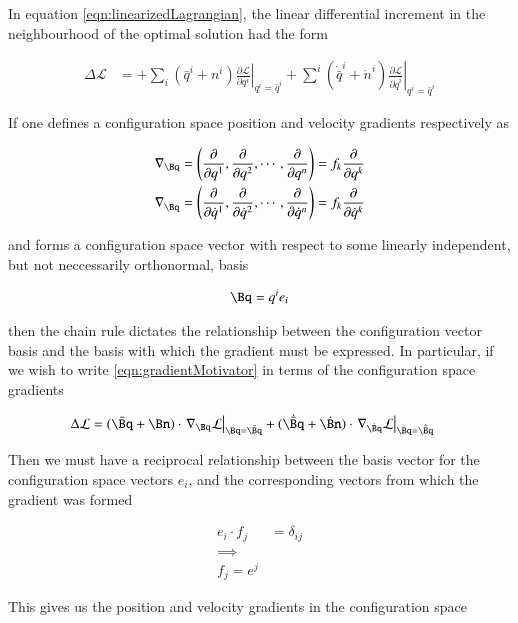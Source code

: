 \documentclass{article}
\newcommand{\LL}[0]{\mathcal{L}}
\newcommand{\qdot}[0]{\dot{q}}
\newcommand{\ndot}[0]{\dot{n}}
\newcommand{\qbar}[0]{\bar{q}}
\newcommand{\qdotbar}[0]{\dot{\bar{q}}}
\newcommand{\PD}[2]{\frac{\partial {#2}}{\partial {#1}}}
\newcommand{\grad}[0]{\nabla}
\begin{document}
In equation \ref{eqn:linearizedLagrangian}, the linear differential increment in the neighbourhood of the optimal solution had the form

\begin{align}\label{eqn:gradientMotivator}
\Delta \LL &=
+ \sum_i (\qbar^i + n^i) \left. \PD{q^i}{\LL} \right\vert_{q^i = \qbar^i}
+ \sum^i (\qdotbar^i + \ndot^i) \left. \PD{\qdot^i}{\LL} \right\vert_{q^i = \qbar^i}
\end{align}

If one defines a configuration space position and velocity gradients respectively as

\begin{align*}
\grad_{\Bq} &= \left(\PD{q^1}{}, \PD{q^2}{}, \cdots, \PD{q^n}{}\right) = f_k \PD{q^k}{} \\
\grad_{\dot{\Bq}} &= \left(\PD{\qdot^1}{}, \PD{\qdot^2}{}, \cdots, \PD{\qdot^n}{}\right) = f_k \PD{\qdot^k}{}
\end{align*}

and forms a configuration space vector with respect to some linearly independent, but not neccessarily orthonormal, basis

\begin{align*}
\Bq = q^i e_i
\end{align*}

then the chain rule dictates the relationship between the configuration vector basis and the basis with which the gradient must be expressed.  In
particular, if we wish to write \ref{eqn:gradientMotivator} in terms of the configuration space gradients

\begin{align*}
\Delta \LL &=
(\bar{\Bq} + \Bn) \cdot \left.\grad_\Bq \LL \right\vert_{\Bq = \bar{\Bq}}
+ (\dot{\bar{\Bq}} + \dot{\Bn}) \cdot \left.\grad_{\dot{\Bq}} \LL \right\vert_{\dot{\Bq} = \dot{\bar{\Bq}}}
\end{align*}

Then we must have a reciprocal relationship between the basis vector for the configuration space vectors $e_i$, and the corresponding vectors
from which the gradient was formed

\begin{align*}
e_i \cdot f_j &= \delta_{i j} \\
\implies \\
f_j = e^j
\end{align*}

This gives us the position and velocity gradients in the configuration space
\end{document}
